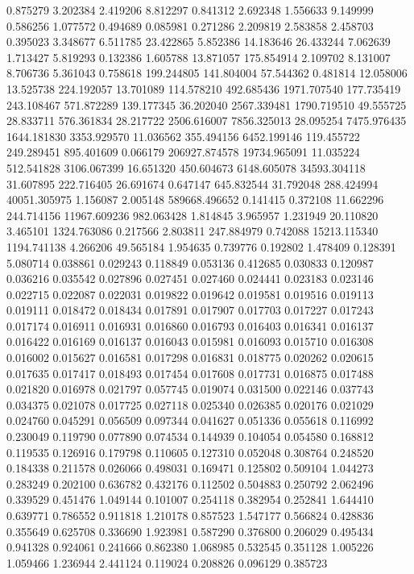 0.875279
3.202384
2.419206
8.812297
0.841312
2.692348
1.556633
9.149999
0.586256
1.077572
0.494689
0.085981
0.271286
2.209819
2.583858
2.458703
0.395023
3.348677
6.511785
23.422865
5.852386
14.183646
26.433244
7.062639
1.713427
5.819293
0.132386
1.605788
13.871057
175.854914
2.109702
8.131007
8.706736
5.361043
0.758618
199.244805
141.804004
57.544362
0.481814
12.058006
13.525738
224.192057
13.701089
114.578210
492.685436
1971.707540
177.735419
243.108467
571.872289
139.177345
36.202040
2567.339481
1790.719510
49.555725
28.833711
576.361834
28.217722
2506.616007
7856.325013
28.095254
7475.976435
1644.181830
3353.929570
11.036562
355.494156
6452.199146
119.455722
249.289451
895.401609
0.066179
206927.874578
19734.965091
11.035224
512.541828
3106.067399
16.651320
450.604673
6148.605078
34593.304118
31.607895
222.716405
26.691674
0.647147
645.832544
31.792048
288.424994
40051.305975
1.156087
2.005148
589668.496652
0.141415
0.372108
11.662296
244.714156
11967.609236
982.063428
1.814845
3.965957
1.231949
20.110820
3.465101
1324.763086
0.217566
2.803811
247.884979
0.742088
15213.115340
1194.741138
4.266206
49.565184
1.954635
0.739776
0.192802
1.478409
0.128391
5.080714
0.038861
0.029243
0.118849
0.053136
0.412685
0.030833
0.120987
0.036216
0.035542
0.027896
0.027451
0.027460
0.024441
0.023183
0.023146
0.022715
0.022087
0.022031
0.019822
0.019642
0.019581
0.019516
0.019113
0.019111
0.018472
0.018434
0.017891
0.017907
0.017703
0.017227
0.017243
0.017174
0.016911
0.016931
0.016860
0.016793
0.016403
0.016341
0.016137
0.016422
0.016169
0.016137
0.016043
0.015981
0.016093
0.015710
0.016308
0.016002
0.015627
0.016581
0.017298
0.016831
0.018775
0.020262
0.020615
0.017635
0.017417
0.018493
0.017454
0.017608
0.017731
0.016875
0.017488
0.021820
0.016978
0.021797
0.057745
0.019074
0.031500
0.022146
0.037743
0.034375
0.021078
0.017725
0.027118
0.025340
0.026385
0.020176
0.021029
0.024760
0.045291
0.056509
0.097344
0.041627
0.051336
0.055618
0.116992
0.230049
0.119790
0.077890
0.074534
0.144939
0.104054
0.054580
0.168812
0.119535
0.126916
0.179798
0.110605
0.127310
0.052048
0.308764
0.248520
0.184338
0.211578
0.026066
0.498031
0.169471
0.125802
0.509104
1.044273
0.283249
0.202100
0.636782
0.432176
0.112502
0.504883
0.250792
2.062496
0.339529
0.451476
1.049144
0.101007
0.254118
0.382954
0.252841
1.644410
0.639771
0.786552
0.911818
1.210178
0.857523
1.547177
0.566824
0.428836
0.355649
0.625708
0.336690
1.923981
0.587290
0.376800
0.206029
0.495434
0.941328
0.924061
0.241666
0.862380
1.068985
0.532545
0.351128
1.005226
1.059466
1.236944
2.441124
0.119024
0.208826
0.096129
0.385723
